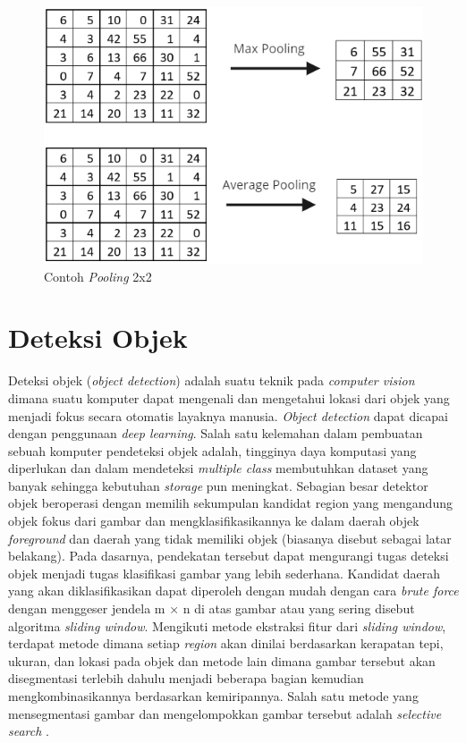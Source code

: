 \begin{figure}[h!]
    \begin{center}
      \includegraphics[width= 0.7\linewidth]{bab2/Pooling.png}
      \caption{Contoh \textit{Pooling} 2x2}
      \label{fig: Pooling}
    \end{center}
\end{figure}

\section{Deteksi Objek}
Deteksi objek (\textit{object detection}) adalah suatu teknik pada \textit{computer vision} dimana
suatu komputer dapat mengenali dan mengetahui lokasi dari objek yang menjadi fokus secara otomatis
layaknya manusia. \textit{Object detection} dapat dicapai dengan penggunaan \textit{deep learning}.
Salah satu kelemahan dalam pembuatan sebuah komputer pendeteksi objek adalah, tingginya daya komputasi
yang diperlukan dan dalam mendeteksi \textit{multiple class} membutuhkan dataset yang banyak sehingga
kebutuhan \textit{storage} pun meningkat. Sebagian besar detektor objek beroperasi dengan memilih 
sekumpulan kandidat region yang mengandung objek fokus dari gambar dan mengklasifikasikannya ke dalam 
daerah objek \textit{foreground} dan daerah yang tidak memiliki objek (biasanya disebut sebagai latar belakang). 
Pada dasarnya, pendekatan tersebut dapat mengurangi tugas deteksi objek menjadi tugas klasifikasi gambar yang lebih sederhana. 
Kandidat daerah yang akan diklasifikasikan dapat diperoleh dengan mudah dengan cara 
\textit{brute force} dengan menggeser jendela m × n di atas gambar atau yang sering disebut algoritma 
\textit{sliding window}. Mengikuti metode ekstraksi fitur dari \textit{sliding window}, terdapat metode dimana setiap 
\textit{region} akan dinilai berdasarkan kerapatan tepi, ukuran, dan lokasi pada objek dan metode lain
dimana gambar tersebut akan disegmentasi terlebih dahulu menjadi beberapa bagian kemudian mengkombinasikannya
berdasarkan kemiripannya. Salah satu metode yang mensegmentasi gambar dan mengelompokkan gambar tersebut adalah
\textit{selective search} \cite{UijlingsIJCV2013}. 

